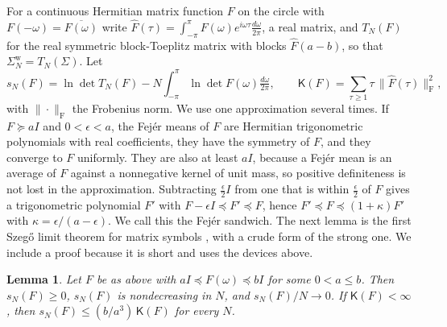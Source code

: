 \documentclass[11pt,onecolumn]{IEEEtran}
\newtheorem{lemma}[theorem]{Lemma}
\newcommand{\dw}{\tfrac{d\omega}{2\pi}}
\begin{document}
For a continuous Hermitian matrix function $F$ on the circle with
$F(-\omega)=\overline{F(\omega)}$ write
$\hat F(\tau)=\int_{-\pi}^{\pi}F(\omega)e^{i\omega\tau}\dw$, a real matrix,
and $T_N(F)$ for the real symmetric block-Toeplitz matrix with blocks
$\hat F(a-b)$, so that $\Sigma^{\mathrm w}_N=T_N(\Sigma)$. Let
\[
s_N(F)=\ln\det T_N(F)-N\int_{-\pi}^{\pi}\ln\det F(\omega)\dw,\qquad
\mathsf K(F)=\sum_{\tau\ge1}\tau\,\bigl\|\hat F(\tau)\bigr\|_{\mathrm F}^2 ,
\]
with $\|\cdot\|_{\mathrm F}$ the Frobenius norm. We use one approximation
several times. If $F\succeq aI$ and $0<\epsilon<a$, the Fej\'er means of
$F$ are Hermitian trigonometric polynomials with real coefficients,
they have the symmetry of $F$, and they converge to $F$ uniformly.
They are also at least $aI$, because a Fej\'er mean is an average of
$F$ against a nonnegative kernel of unit mass, so positive
definiteness is not lost in the approximation.
Subtracting $\tfrac\epsilon2I$ from one that is within $\tfrac\epsilon2$
of $F$ gives a trigonometric polynomial $F'$ with
$F-\epsilon I\preceq F'\preceq F$, hence
$F'\preceq F\preceq(1+\kappa)F'$ with $\kappa=\epsilon/(a-\epsilon)$. We
call this the Fej\'er sandwich. The next lemma is the
first Szeg\H{o} limit theorem for matrix symbols
\cite{gutierrez2012}, with a crude form of the strong one.
We include a proof because it is short and uses the devices above.

\begin{lemma}\label{lem:szego}
Let $F$ be as above with $aI\preceq F(\omega)\preceq bI$ for some
$0<a\le b$. Then $s_N(F)\ge0$, $s_N(F)$ is nondecreasing in $N$, and
$s_N(F)/N\to0$. If $\mathsf K(F)<\infty$, then
$s_N(F)\le(b/a^3)\,\mathsf K(F)$ for every $N$.
\end{lemma}
\end{document}
